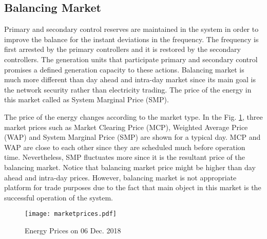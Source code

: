 \subsection{Balancing Market}
Primary and secondary control reserves are maintained in the system in order to improve the balance for the instant deviations in the frequency. The frequency is first arrested by the primary controllers and it is restored by the secondary controllers. The generation units that participate primary and secondary control promises a defined generation capacity to these actions. Balancing market is much more different than day ahead and intra-day market since its main goal is the network security rather than electricity trading. The price of the energy in this market called as System Marginal Price (SMP).\par
The price of the energy changes according to the market type. In the Fig. \ref{markets}, three market prices such as Market Clearing Price (MCP), Weighted Average Price (WAP) and System Marginal Price (SMP) are shown for a typical day. MCP and WAP are close to each other since they are scheduled much before operation time. Nevertheless, SMP fluctuates more since it is the resultant price of the balancing market. Notice that balancing market price might be higher than day ahead and intra-day prices. However, balancing market is not appropriate platform for trade purposes due to the fact that main object in this market is the successful operation of the system.
\begin{figure}[h!]
	\centering
	\texttt{[image: marketprices.pdf]}
	\caption{Energy Prices on 06 Dec. 2018 \cite{TEIAS2019}}
	\label{markets}
\end{figure}
